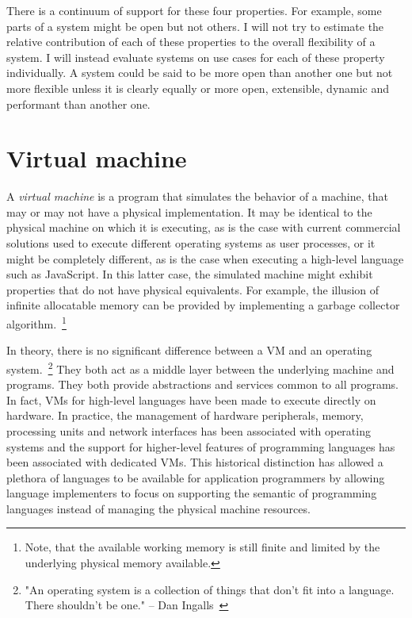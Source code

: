 There is a continuum of support for these four properties. For example, some
parts of a system might be open but not others.  I will not try to estimate the
relative contribution of each of these properties to the overall flexibility of
a system. I will instead evaluate systems on use cases for each of these
property individually. A system could be said to be more open than another one
but not more flexible unless it is clearly equally or more open, extensible,
dynamic and performant than another one.

\section{Virtual machine}

A \textit{virtual machine} is a program that simulates the behavior of a
machine, that may or may not have a physical implementation. It may be
identical to the physical machine on which it is executing, as is the case with
current commercial solutions used to execute different operating systems as user
processes, or it might be completely different, as is the case when executing a
high-level language such as JavaScript. In this latter case, the simulated
machine might exhibit properties that do not have physical equivalents.
For example, the illusion of infinite allocatable memory can be provided by
implementing a garbage collector algorithm.~\footnote{Note, that the available
working memory is still finite and limited by the underlying physical memory
available.} 

In theory, there is no significant difference between a VM and
an operating system.~\footnote{"An operating system is a collection of
things that don't fit into a language. There shouldn't be one." -- Dan
Ingalls~\cite{Ingalls1981}} They both act as a middle layer between the
underlying machine and programs. They both provide abstractions and
services common to all programs. In fact, VMs for high-level
languages have been made to execute directly on hardware. In practice, the
management of hardware peripherals, memory, processing units and network
interfaces has been associated with operating systems and the support for
higher-level features of programming languages has been associated with
dedicated VMs. This historical distinction has allowed a plethora
of languages to be available for application programmers by allowing language
implementers to focus on supporting the semantic of programming languages
instead of managing the physical machine resources.

